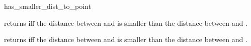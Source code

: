 \begin{ccRefFunction}{has_smaller_dist_to_point}

         {returns  iff the distance between 
          and  is smaller than the distance between 
          and .}

         {returns  iff the distance between 
          and  is smaller than the distance between 
          and .}
\end{ccRefFunction}

